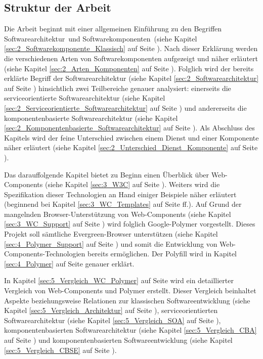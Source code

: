 
\subsection{Struktur der Arbeit}
\label{sec:1_Struktur}

Die Arbeit beginnt mit einer allgemeinen Einführung zu den Begriffen \glqq Softwarearchitektur\grqq\ und \glqq Softwarekomponenten\grqq\ (siehe Kapitel \ref{sec:2_Softwarekomponente_Klassisch} auf Seite \pageref{sec:2_Softwarekomponente_Klassisch}). Nach dieser Erklärung werden die verschiedenen Arten von Softwarekomponenten aufgezeigt und näher erläutert (siehe Kapitel \ref{sec:2_Arten_Komponenten} auf Seite \pageref{sec:2_Arten_Komponenten}). Folglich wird der bereits erklärte Begriff der Softwarearchitektur (siehe Kapitel \ref{sec:2_Softwarearchitektur} auf Seite \pageref{sec:2_Softwarearchitektur}) hinsichtlich zwei Teilbereiche genauer analysiert: einerseits die serviceorientierte Softwarearchitektur (siehe Kapitel \ref{sec:2_Serviceorientierte_Softwarearchitektur} auf Seite \pageref{sec:2_Serviceorientierte_Softwarearchitektur}) und andererseits die komponentenbasierte Softwarearchitektur (siehe Kapitel \ref{sec:2_Komponentenbasierte_Softwarearchitektur} auf Seite \pageref{sec:2_Komponentenbasierte_Softwarearchitektur}). Als Abschluss des Kapitels wird der feine Unterschied zwischen einem Dienst und einer Komponente näher erläutert (siehe Kapitel \ref{sec:2_Unterschied_Dienst_Komponente} auf Seite \pageref{sec:2_Unterschied_Dienst_Komponente}).

Das darauffolgende Kapitel bietet zu Beginn einen Überblick über Web-Components (siehe Kapitel \ref{sec:3_W3C} auf Seite \pageref{sec:3_W3C}). Weiters wird die Spezifikation dieser Technologien an Hand einiger Beispiele näher erläutert (beginnend bei Kapitel \ref{sec:3_WC_Templates} auf Seite \pageref{sec:3_WC_Templates} ff.). Auf Grund der mangelnden Browser-Unterstützung von Web-Components (siehe Kapitel \ref{sec:3_WC_Support} auf Seite \pageref{sec:3_WC_Support}) wird folglich Google-Polymer vorgestellt. Dieses Projekt soll sämtliche \glqq Evergreen\grqq -Browser unterstützen (siehe Kapitel \ref{sec:4_Polymer_Support} auf Seite \pageref{sec:4_Polymer_Support}) und somit die Entwicklung von Web-Components-Technologien bereits ermöglichen. Der Polyfill wird in Kapitel \ref{sec:4_Polymer} auf Seite \pageref{sec:4_Polymer} genauer erklärt.

In Kapitel \ref{sec:5_Vergleich_WC_Polymer} auf Seite \pageref{sec:5_Vergleich_WC_Polymer} wird ein detaillierter Vergleich von Web-Components und Polymer erstellt. Dieser Vergleich beinhaltet Aspekte beziehungsweise Relationen zur klassischen Softwareentwicklung (siehe Kapitel \ref{sec:5_Vergleich_Architektur} auf Seite \pageref{sec:5_Vergleich_Architektur}), serviceorientierten Softwarearchitektur (siehe Kapitel \ref{sec:5_Vergleich_SOA} auf Seite \pageref{sec:5_Vergleich_SOA}), komponentenbasierten Softwarearchitektur (siehe Kapitel \ref{sec:5_Vergleich_CBA} auf Seite \pageref{sec:5_Vergleich_CBA}) und komponentenbasierten Softwareentwicklung (siehe Kapitel \ref{sec:5_Vergleich_CBSE} auf Seite \pageref{sec:5_Vergleich_CBSE}).


